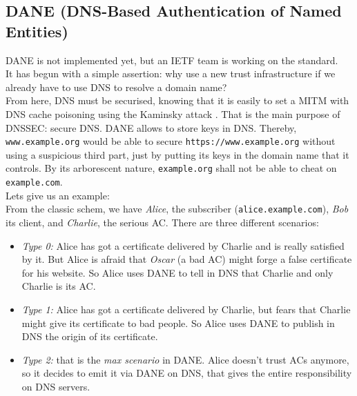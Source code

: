 \documentclass[journal, a4paper]{IEEEtran}
\begin{document}
\subsection{DANE (DNS-Based Authentication of Named Entities)}
\label{dane}

DANE is not implemented yet, but an IETF team is working on the standard.\\
It has begun with a simple assertion: why use a new trust infrastructure if we already have to use DNS to resolve a domain name?\\
From here, DNS must be securised, knowing that it is easily to set a MITM with DNS cache poisoning \cite{aa04} using the Kaminsky attack \cite{bor08}. That is the main purpose of DNSSEC: secure DNS. DANE allows to store keys in DNS. Thereby, \verb$www.example.org$ would be able to secure \verb$https://www.example.org$ without using a suspicious third part, just by putting its keys in the domain name that it controls. By its arborescent nature, \verb$example.org$ shall not be able to cheat on \verb$example.com$.\\

Lets give us an example:\\
From the classic schem, we have \textit{Alice}, the subscriber (\verb$alice.example.com$), \textit{Bob} its client, and \textit{Charlie}, the serious AC. There are three different scenarios:
\begin{itemize}
	\item \textit{Type 0:} Alice has got a certificate delivered by Charlie and is really satisfied by it. But Alice is afraid that \textit{Oscar} (a bad AC) might forge a false certificate for his website. So Alice uses DANE to tell in DNS that Charlie and only Charlie is its AC.
	\item \textit{Type 1:} Alice has got a certificate delivered by Charlie, but fears that Charlie might give its certificate to bad people. So Alice uses DANE to publish in DNS the origin of its certificate.
	\item \textit{Type 2:} that is the \textit{max scenario} in DANE. Alice doesn't trust ACs anymore, so it decides to emit it via DANE on DNS, that gives the entire responsibility on DNS servers. 
\end{itemize}
\end{document}
